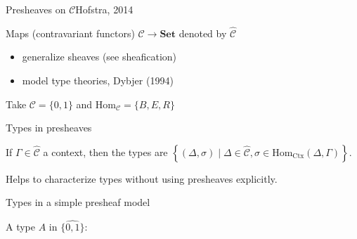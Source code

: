 \documentclass[english, draft]{beamer}
\begin{document}
\begin{frame}{Presheaves on $\mathcal{C}$}{Hofstra, 2014}
 
    Maps (contravariant functors) $\mathcal{C} \rightarrow \mathbf{Set}$ denoted by $\hat{\mathcal{C}}$
    
    \begin{itemize}
    \item generalize sheaves (see sheafication)
    \item model type theories, Dybjer (1994)
    \end{itemize}
    
    \begin{example}    
    Take $\mathcal{C} = \{0,1\}$ and $\text{Hom}_{\mathcal{C}}= \{B,E,R\}$
    
        
    
    
    
   \end{example} 
   
    
   \end{frame}
   


\begin{frame}{Types in presheaves}
    

    \begin{lemma}
        If $\Gamma \in \widehat{\mathcal{C}}$ a context, then the types are $ \left\{ (\Delta, \sigma) \mid \Delta \in \widehat{\mathcal{C}}, \sigma \in \text{Hom}_{\text{Ctx}}(\Delta , \Gamma) \right\}$.
     \end{lemma}

     Helps to characterize types without using presheaves explicitly.
\end{frame}


\begin{frame}{Types in a simple presheaf model}
  \begin{example}
  A type $A$ in $\widehat{\{0, 1 \}}$:
    \begin{figure}\label{depgraphdiag}
            \begin{center} 
              
            \end{center}    
    \end{figure}
 \end{example}


\end{frame}
\end{document}
